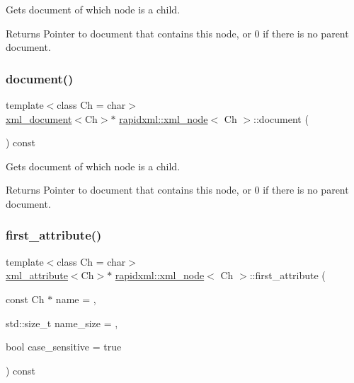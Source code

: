 Gets document of which node is a child. \begin{DoxyReturn}{Returns}
Pointer to document that contains this node, or 0 if there is no parent document. 
\end{DoxyReturn}
\mbox{\label{classrapidxml_1_1xml__node_af23d2d56182411e9261ca6974bfd767f}} 
\subsubsection{\texorpdfstring{document()}{document()}\hspace{0.1cm}{\footnotesize\ttfamily [2/2]}}
{\footnotesize\ttfamily template$<$class Ch = char$>$ \\
\mbox{\hyperlink{classrapidxml_1_1xml__document}{xml\+\_\+document}}$<$Ch$>$$\ast$ \mbox{\hyperlink{classrapidxml_1_1xml__node}{rapidxml\+::xml\+\_\+node}}$<$ Ch $>$\+::document (\begin{DoxyParamCaption}{ }\end{DoxyParamCaption}) const\hspace{0.3cm}{\ttfamily [inline]}}

Gets document of which node is a child. \begin{DoxyReturn}{Returns}
Pointer to document that contains this node, or 0 if there is no parent document. 
\end{DoxyReturn}
\mbox{\label{classrapidxml_1_1xml__node_ab816ab6f13ee4b0588d5b76b0697511c}} 
\subsubsection{\texorpdfstring{first\+\_\+attribute()}{first\_attribute()}\hspace{0.1cm}{\footnotesize\ttfamily [1/2]}}
{\footnotesize\ttfamily template$<$class Ch = char$>$ \\
\mbox{\hyperlink{classrapidxml_1_1xml__attribute}{xml\+\_\+attribute}}$<$Ch$>$$\ast$ \mbox{\hyperlink{classrapidxml_1_1xml__node}{rapidxml\+::xml\+\_\+node}}$<$ Ch $>$\+::first\+\_\+attribute (\begin{DoxyParamCaption}\item[{const Ch $\ast$}]{name = {},  }\item[{std\+::size\+\_\+t}]{name\+\_\+size = {},  }\item[{bool}]{case\+\_\+sensitive = {\ttfamily true} }\end{DoxyParamCaption}) const\hspace{0.3cm}{\ttfamily [inline]}}


